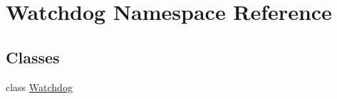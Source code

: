 \hypertarget{namespaceWatchdog}{\section{Watchdog Namespace Reference}
\label{namespaceWatchdog}
}
\subsection*{Classes}
\begin{DoxyCompactItemize}
\item 
class \hyperlink{classWatchdog_1_1Watchdog}{Watchdog}
\end{DoxyCompactItemize}
